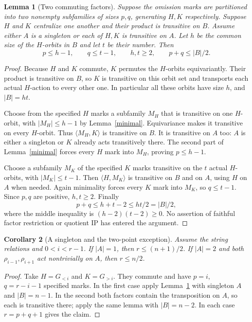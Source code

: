 \documentclass[11pt,a4paper]{article}
\newtheorem{lemma}{Lemma}
\newtheorem{corollary}[lemma]{Corollary}
\newcommand{\gen}[1]{\langle#1\rangle}
\begin{document}
\begin{lemma}[Two commuting factors]\label{factors}
Suppose the omission marks are partitioned into two nonempty
subfamilies of sizes $p,q$, generating $H,K$ respectively.
Suppose $H$ and $K$ centralize one another and their product is transitive
on $B$. Assume either $A$ is a singleton or each of $H,K$
is transitive on $A$. Let $h$ be the common size of the
$H$-orbits in $B$ and let $t$ be their number. Then
\[
       p\le h-1,\qquad q\le t-1,\qquad
       h,t\ge2,\qquad p+q\le |B|/2.
\]
\end{lemma}
\begin{proof}
Because $H$ and $K$ commute, $K$ permutes the $H$-orbits
equivariantly. Their product is transitive on $B$, so $K$
is transitive on this orbit set and transports each actual
$H$-action to every other one. In particular all these orbits
have size $h$, and $|B|=ht$.

Choose from the specified $H$ marks a subfamily $M_H$ that
is transitive on one $H$-orbit, with $|M_H|\le h-1$ by
Lemma~\ref{minimal}. Equivariance makes it transitive on
every $H$-orbit. Thus $\gen{M_H,K}$ is transitive on $B$.
It is transitive on $A$ too: $A$ is either a singleton or
$K$ already acts transitively there. The second part of
Lemma~\ref{minimal} forces every $H$ mark into $M_H$,
proving $p\le h-1$.

Choose a subfamily $M_K$ of the specified $K$ marks
transitive on the $t$ actual $H$-orbits, with
$|M_K|\le t-1$. Then $\gen{H,M_K}$ is transitive on $B$
and on $A$, using $H$ on $A$ when needed. Again minimality
forces every $K$ mark into $M_K$, so $q\le t-1$.
Since $p,q$ are positive, $h,t\ge2$. Finally
\[
 p+q\le h+t-2\le ht/2=|B|/2,
\]
where the middle inequality is $(h-2)(t-2)\ge0$.
No assertion of faithful factor restriction or quotient IP
has entered the argument.
\end{proof}

\begin{corollary}[A singleton and the two-point exception]\label{small}
Assume the string relations and $0<i<r-1$.
If $|A|=1$, then $r\le(n+1)/2$.
If $|A|=2$ and both $\rho_{i-1},\rho_{i+1}$ act nontrivially
on $A$, then $r\le n/2$.
\end{corollary}
\begin{proof}
Take $H=G_{<i}$ and $K=G_{>i}$. They commute and have
$p=i$, $q=r-i-1$ specified marks. In the first case apply
Lemma~\ref{factors} with singleton $A$ and $|B|=n-1$.
In the second both factors contain the transposition on
$A$, so each is transitive there; apply the same lemma
with $|B|=n-2$. In each case $r=p+q+1$ gives the claim.
\end{proof}
\end{document}
